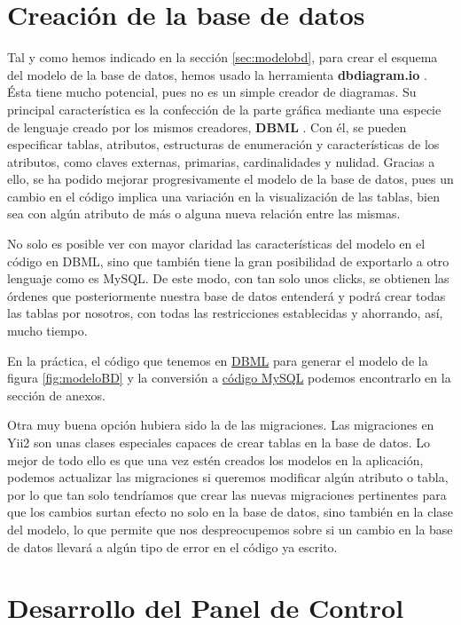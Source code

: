 \section{Creación de la base de datos}

Tal y como hemos indicado en la sección \ref{sec:modelobd}, para crear el esquema del modelo de la base de datos, hemos usado la herramienta \textbf{dbdiagram.io} \cite{dbdiagram}. Ésta tiene mucho potencial, pues no es un simple creador de diagramas. Su principal característica es la confección de la parte gráfica mediante una especie de lenguaje creado por los mismos creadores, \textbf{DBML} \cite{dbml}. Con él, se pueden especificar tablas, atributos, estructuras de enumeración y características de los atributos, como claves externas, primarias, cardinalidades y nulidad. Gracias a ello, se ha podido mejorar progresivamente el modelo de la base de datos, pues un cambio en el código implica una variación en la visualización de las tablas, bien sea con algún atributo de más o alguna nueva relación entre las mismas.

No solo es posible ver con mayor claridad las características del modelo en el código en DBML, sino que también tiene la gran posibilidad de exportarlo a otro lenguaje como es MySQL. De este modo, con tan solo unos clicks, se obtienen las órdenes que posteriormente nuestra base de datos entenderá y podrá crear todas las tablas por nosotros, con todas las restricciones establecidas y ahorrando, así, mucho tiempo.

En la práctica, el código que tenemos en \hyperref[anexo:dbml]{DBML} para generar el modelo de la figura \ref{fig:modeloBD} y la conversión a  \hyperref[anexo:mysql]{código MySQL} podemos encontrarlo en la sección de anexos.

Otra muy buena opción hubiera sido la de las migraciones. Las migraciones en Yii2 son unas clases especiales capaces de crear tablas en la base de datos. Lo mejor de todo ello es que una vez estén creados los modelos en la aplicación, podemos actualizar las migraciones si queremos modificar algún atributo o tabla, por lo que tan solo tendríamos que crear las nuevas migraciones pertinentes para que los cambios surtan efecto no solo en la base de datos, sino también en la clase del modelo, lo que permite que nos despreocupemos sobre si un cambio en la base de datos llevará a algún tipo de error en el código ya escrito.

\section{Desarrollo del Panel de Control}


